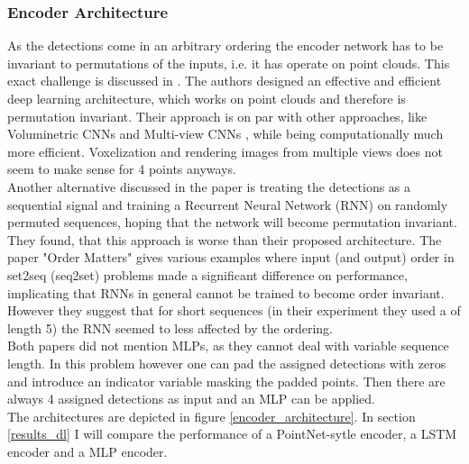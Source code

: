 \documentclass{article}
\begin{document}
\subsubsection{Encoder Architecture}
\label{encoder}
As the detections come in an arbitrary ordering the encoder network has to be invariant to permutations of the inputs, i.e. it has operate on point clouds. This exact challenge is discussed in \cite{PointNet}. The authors designed an effective and efficient deep learning architecture, which works on point clouds and therefore is permutation invariant. Their approach is on par with other approaches, like Voluminetric CNNs \cite{VCNN} and Multi-view CNNs \cite{MVCNN}, while being computationally much more efficient. Voxelization and rendering images from multiple views does not seem to make sense for 4 points anyways.\\
Another alternative discussed in the paper is treating the detections as a sequential signal and training a Recurrent Neural Network (RNN) on randomly permuted sequences, hoping that the network will become permutation invariant. They found, that this approach is worse than their proposed architecture. The paper "Order Matters" \cite{orderMatters} gives various examples where input (and output) order in set2seq (seq2set) problems made a significant difference on performance, implicating that RNNs in general cannot be trained to become order invariant. However they suggest that for short  sequences (in their experiment they used a of length 5) the RNN seemed to less affected by the ordering.\\
Both papers did not mention MLPs, as they cannot deal with variable sequence length. In this problem however one can pad  the assigned detections with zeros and introduce an indicator variable masking the padded points. Then there are always 4 assigned detections as input and an MLP can be applied. \\
The architectures are depicted in figure \ref{encoder_architecture}.
In section \ref{results_dl} I will compare the performance of a PointNet-sytle encoder, a LSTM encoder and a MLP encoder.

\end{document}

